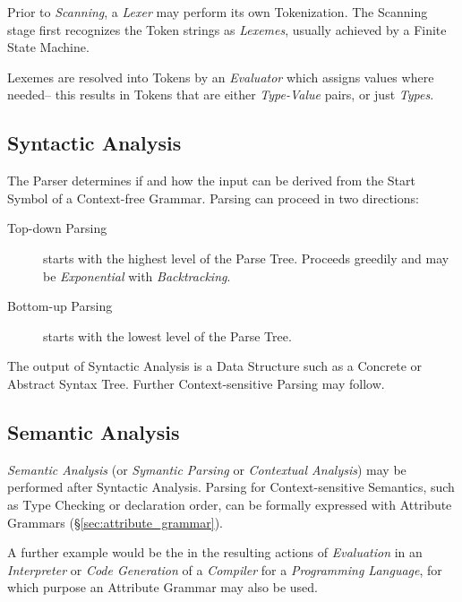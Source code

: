 Prior to \emph{Scanning}, a \emph{Lexer} may perform its own
Tokenization. The Scanning stage first recognizes the Token
strings as \emph{Lexemes}, usually achieved by a Finite State
Machine.

Lexemes are resolved into Tokens by an \emph{Evaluator} which assigns
values where needed-- this results in Tokens that are either
\emph{Type-Value} pairs, or just \emph{Types}.



\subsection{Syntactic Analysis}

The Parser determines if and how the input can be derived from the
Start Symbol of a Context-free Grammar. Parsing can proceed in two
directions:
\begin{description}
    \item [Top-down Parsing] starts with the highest level of the Parse
      Tree. Proceeds greedily and may be \emph{Exponential} with
      \emph{Backtracking}.
    \item [Bottom-up Parsing] starts with the lowest level of the
      Parse Tree.
\end{description}
The output of Syntactic Analysis is a Data Structure such as a
Concrete or Abstract Syntax Tree. Further Context-sensitive Parsing
may follow.



\subsection{Semantic Analysis}\label{sec:semantic_analysis}

\emph{Semantic Analysis} (or \emph{Symantic Parsing} or
\emph{Contextual Analysis}) may be performed after Syntactic Analysis.
Parsing for Context-sensitive Semantics, such as Type Checking or
declaration order, can be formally expressed with Attribute Grammars
(\S\ref{sec:attribute_grammar}).

A further example would be the in the resulting actions of
\emph{Evaluation} in an \emph{Interpreter} or \emph{Code Generation}
of a \emph{Compiler} for a \emph{Programming Language}, for which
purpose an Attribute Grammar may also be used.



